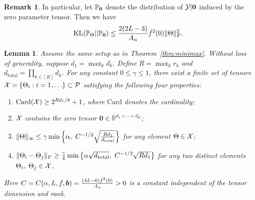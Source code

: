 \documentclass{article}
\theoremstyle{plain}
\newtheorem{lem}{Lemma}
\theoremstyle{definition}
\newtheorem{rmk}{Remark}
\begin{document}
\begin{rmk} In particular, let $\mathbb{P}_{\bf{0}}$ denote the distribution of $\mathcal{Y}|\bf{0}$ induced by the zero parameter tensor. Then we have
\[
\text{KL}(\mathbb{P}_{\Theta}||\mathbb{P}_{\bf{0}})\leq {2(2L-3)\over A_\alpha}  \dot{f}^2(0)\lVert\Theta\rVert_F^2.
\]
\end{rmk}


\begin{lem}\label{lem:construction}
Assume the same setup as in Theorem~\ref{thm:minimax}. Without loss of generality, suppose $d_1=\max_kd_k$. Define $R=\max_k r_k$ and $d_{\text{total}}=\prod_{k\in[K]} d_k$. For any constant $0\leq \gamma \leq 1$, there exist a finite set of tensors $\mathcal{X}=\{\Theta_i: i=1,\ldots\}\subset \mathcal{P}$ satisfying the following four properties:
\begin{enumerate}
\item $\text{Card}(\mathcal{X})\geq 2^{Rd_1/8}+1$, where $\text{Card}$ denotes the cardinality;
\item $\mathcal{X}$ contains the zero tensor $\mathbf{0}\in\mathbb{R}^{d_1\times \cdots\times d_K}$;
\item $\lVert\Theta\rVert_\infty\leq \gamma \min\left\{ \alpha ,\ C^{-1/2}\sqrt{Rd_1\over d_{\text{total}}} \right\} $ for any element $\Theta\in\mathcal{X}$;
\item $\FnormSize{}{\Theta_i-\Theta_j}\geq {\gamma\over 4} \min\left\{ \alpha\sqrt{d_{\text{total}}},\ C^{-1/2}\sqrt{Rd_1}\right\}$ for any two distinct elements $\Theta_i,\; \Theta_j\in\mathcal{X}$,
\end{enumerate}
Here $C=C(\alpha,L,f,\bm{b})={(4L-6)\dot{f}^2(0)\over A_\alpha }>0$ is a constant independent of the tensor dimension and rank.
\end{lem}
\end{document}
